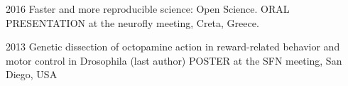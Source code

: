 {}

\begin{itemize}
\begin{sloppypar}

\item[2016] Faster and more reproducible science: Open Science. ORAL PRESENTATION at the neurofly meeting, Creta, Greece.

\item[2013] Genetic dissection of octopamine action in reward-related behavior and motor control in Drosophila (last author) POSTER at the SFN meeting, San Diego, USA

%



%
%
%
%
%


\end{sloppypar}
\end{itemize}
